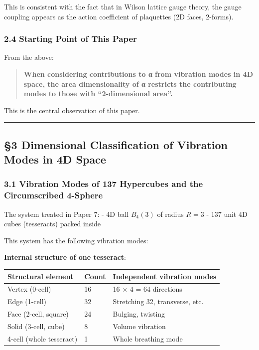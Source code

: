 \documentclass[
  11pt]{article}
\newcounter{none} %
\begin{document}
This is consistent with the fact that in Wilson lattice gauge theory,
the gauge coupling appears as the action coefficient of plaquettes (2D
faces, 2-forms).

\subsubsection{2.4 Starting Point of This
Paper}\label{starting-point-of-this-paper}

From the above:

\begin{quote}
\textbf{When considering contributions to α from vibration modes in 4D
space, the area dimensionality of α restricts the contributing modes to
those with ``2-dimensional area''.}
\end{quote}

This is the central observation of this paper.

\begin{center}\rule{0.5\linewidth}{0.5pt}\end{center}

\subsection{§3 Dimensional Classification of Vibration Modes in 4D
Space}\label{dimensional-classification-of-vibration-modes-in-4d-space}

\subsubsection{3.1 Vibration Modes of 137 Hypercubes and the
Circumscribed
4-Sphere}\label{vibration-modes-of-137-hypercubes-and-the-circumscribed-4-sphere}

The system treated in Paper 7: - 4D ball \(B_4(3)\) of radius \(R = 3\)
- 137 unit 4D cubes (tesseracts) packed inside

This system has the following vibration modes:

\textbf{Internal structure of one tesseract}:

{\def\LTcaptype{none} %
\begin{longtable}[]{@{}lll@{}}
\toprule\noalign{}
Structural element & Count & Independent vibration modes \\
\midrule\noalign{}
\endhead
\bottomrule\noalign{}
\endlastfoot
Vertex (0-cell) & 16 & 16 × 4 = 64 directions \\
Edge (1-cell) & 32 & Stretching 32, transverse, etc. \\
Face (2-cell, square) & 24 & Bulging, twisting \\
Solid (3-cell, cube) & 8 & Volume vibration \\
4-cell (whole tesseract) & 1 & Whole breathing mode \\
\end{longtable}
}
\end{document}
